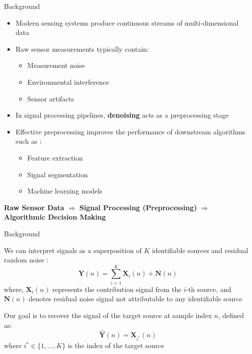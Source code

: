 \documentclass{beamer}
\begin{document}

\begin{frame}{Background}

\begin{itemize}
    \item Modern sensing systems produce continuous streams of multi-dimensional data
    \item Raw sensor measurements typically contain: \cite{OHaver2026SignalsAndNoise}
    \begin{itemize}
        \item Measurement noise
        \item Environmental interference
        \item Sensor artifacts
    \end{itemize}
    \item In signal processing pipelines, \textbf{denoising} acts as a preprocessing stage
    \item Effective preprocessing improves the performance of downstream algorithms such as \cite{Garcia2015DataPreprocessing}:
    \begin{itemize}
        \item Feature extraction
        \item Signal segmentation
        \item Machine learning models
    \end{itemize}
\end{itemize}
\begin{center}
\large
\textbf{Raw Sensor Data} $\Rightarrow$ \textbf{Signal Processing (Preprocessing)} $\Rightarrow$ \textbf{Algorithmic Decision Making}
\end{center}

\end{frame}
\begin{frame}{Background}

We can interpret signals as a superposition of $K$ identifiable sources and residual random noise \cite{oppenheim1997signals}:
\[
\mathbf{Y}(n) = \sum_{i=1}^{K} \mathbf{X}_i(n) + \mathbf{N}(n)
\]
where, $\mathbf{X}_i(n)$ represents the contribution signal from the $i$-th source, and $\mathbf{N}(n)$ denotes residual noise signal not attributable to any identifiable source

Our goal is to recover the signal of the target source at sample index $n$, defined as:
\[
\hat{\mathbf{Y}}(n) = \mathbf{X}_{i^*}(n)
\]
where $i^* \in \{1, \ldots, K\}$ is the index of the target source

\end{frame}
\end{document}
